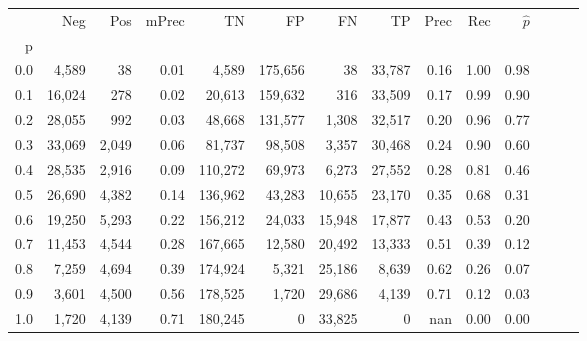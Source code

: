 \begin{tabular}{rrrrrrrrrrrrrr}
\toprule
{} &     Neg &    Pos & mPrec &       TN &       FP &      FN &      TP &  Prec &   Rec & $\hat{p}$ \\
p   &         &        &       &          &          &         &         &       &       &           \\
\midrule
0.0 &   4,589 &     38 &  0.01 &    4,589 &  175,656 &      38 &  33,787 &  0.16 &  1.00 &      0.98 \\
0.1 &  16,024 &    278 &  0.02 &   20,613 &  159,632 &     316 &  33,509 &  0.17 &  0.99 &      0.90 \\
0.2 &  28,055 &    992 &  0.03 &   48,668 &  131,577 &   1,308 &  32,517 &  0.20 &  0.96 &      0.77 \\
0.3 &  33,069 &  2,049 &  0.06 &   81,737 &   98,508 &   3,357 &  30,468 &  0.24 &  0.90 &      0.60 \\
0.4 &  28,535 &  2,916 &  0.09 &  110,272 &   69,973 &   6,273 &  27,552 &  0.28 &  0.81 &      0.46 \\
0.5 &  26,690 &  4,382 &  0.14 &  136,962 &   43,283 &  10,655 &  23,170 &  0.35 &  0.68 &      0.31 \\
0.6 &  19,250 &  5,293 &  0.22 &  156,212 &   24,033 &  15,948 &  17,877 &  0.43 &  0.53 &      0.20 \\
0.7 &  11,453 &  4,544 &  0.28 &  167,665 &   12,580 &  20,492 &  13,333 &  0.51 &  0.39 &      0.12 \\
0.8 &   7,259 &  4,694 &  0.39 &  174,924 &    5,321 &  25,186 &   8,639 &  0.62 &  0.26 &      0.07 \\
0.9 &   3,601 &  4,500 &  0.56 &  178,525 &    1,720 &  29,686 &   4,139 &  0.71 &  0.12 &      0.03 \\
1.0 &   1,720 &  4,139 &  0.71 &  180,245 &        0 &  33,825 &       0 &   nan &  0.00 &      0.00 \\
\bottomrule
\end{tabular}
